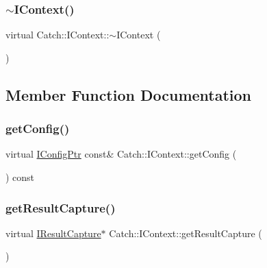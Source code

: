 \subsubsection{\texorpdfstring{$\sim$\+I\+Context()}{~IContext()}}
{\footnotesize\ttfamily virtual Catch\+::\+I\+Context\+::$\sim$\+I\+Context (\begin{DoxyParamCaption}{ }\end{DoxyParamCaption})\hspace{0.3cm}{\ttfamily [virtual]}}



\subsection{Member Function Documentation}
\mbox{\label{struct_catch_1_1_i_context_a72a2718232adea8925fec9e71d3efd75}} 
\subsubsection{\texorpdfstring{get\+Config()}{getConfig()}}
{\footnotesize\ttfamily virtual \mbox{\hyperlink{namespace_catch_afd20a5d4f9d2f4d525db81a7765367b0}{I\+Config\+Ptr}} const\& Catch\+::\+I\+Context\+::get\+Config (\begin{DoxyParamCaption}{ }\end{DoxyParamCaption}) const\hspace{0.3cm}{\ttfamily [pure virtual]}}

\mbox{\label{struct_catch_1_1_i_context_a684e4ae71d1fdf3060c352ecde1d122f}} 
\subsubsection{\texorpdfstring{get\+Result\+Capture()}{getResultCapture()}}
{\footnotesize\ttfamily virtual \mbox{\hyperlink{struct_catch_1_1_i_result_capture}{I\+Result\+Capture}}$\ast$ Catch\+::\+I\+Context\+::get\+Result\+Capture (\begin{DoxyParamCaption}{ }\end{DoxyParamCaption})\hspace{0.3cm}{\ttfamily [pure virtual]}}

